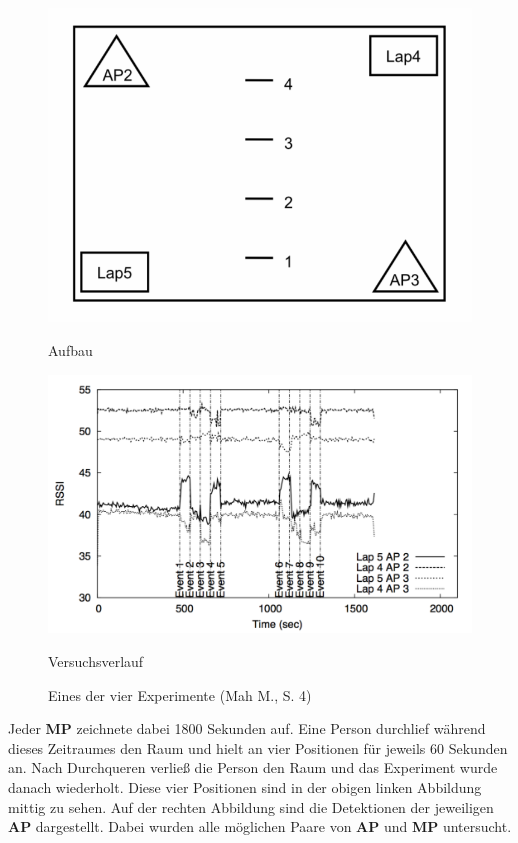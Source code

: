 \begin{figure}[H]
\centering
\begin{minipage}{.5\textwidth}
  \centering
	\includegraphics[scale=0.6]{pictures/experiment}
	\caption*{Aufbau}
\end{minipage}%
\begin{minipage}{.5\textwidth}
  \centering
  \includegraphics[scale=0.45]{pictures/versuch}
  \caption*{Versuchsverlauf}
\end{minipage}
\caption{Eines der vier Experimente (Mah M., S. 4)}
\end{figure}

Jeder \textbf{MP} zeichnete dabei 1800 Sekunden auf. Eine Person durchlief während dieses Zeitraumes den Raum und hielt an vier Positionen für jeweils 60 Sekunden an. Nach Durchqueren verließ die Person den Raum und das Experiment wurde danach wiederholt. Diese vier Positionen sind in der obigen linken Abbildung mittig zu sehen. Auf der rechten Abbildung sind die Detektionen der jeweiligen \textbf{AP} dargestellt. Dabei wurden alle möglichen Paare von \textbf{AP} und \textbf{MP} untersucht.

